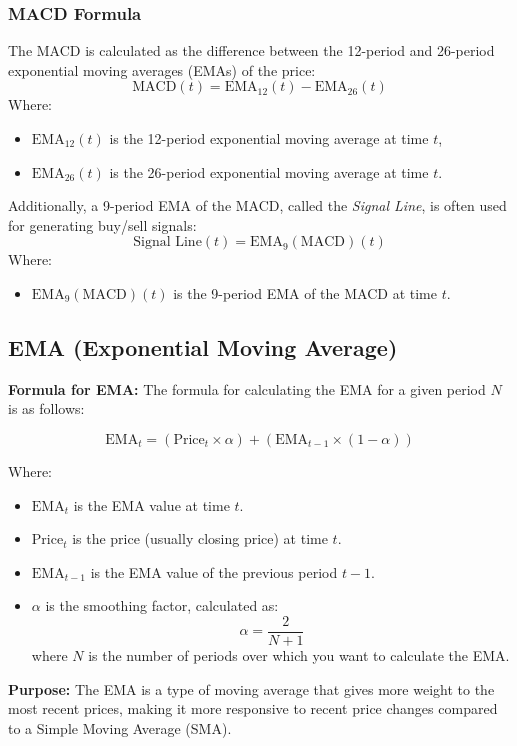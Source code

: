 \documentclass[12pt]{article}
\begin{document}
\subsubsection*{MACD Formula}
The MACD is calculated as the difference between the 12-period and 26-period exponential moving averages (EMAs) of the price:
\[
\text{MACD}(t) = \text{EMA}_{12}(t) - \text{EMA}_{26}(t)
\]
Where:
\begin{itemize}
	\item \(\text{EMA}_{12}(t)\) is the 12-period exponential moving average at time \(t\),
	\item \(\text{EMA}_{26}(t)\) is the 26-period exponential moving average at time \(t\).
\end{itemize}
Additionally, a 9-period EMA of the MACD, called the \textit{Signal Line}, is often used for generating buy/sell signals:
\[
\text{Signal Line}(t) = \text{EMA}_{9}(\text{MACD})(t)
\]
Where:
\begin{itemize}
	\item \(\text{EMA}_{9}(\text{MACD})(t)\) is the 9-period EMA of the MACD at time \(t\).
\end{itemize}

\newpage
\subsection{EMA (Exponential Moving Average)}

\textbf{Formula for EMA:}
The formula for calculating the EMA for a given period $N$ is as follows:

\[
\text{EMA}_t = (\text{Price}_t \times \alpha) + (\text{EMA}_{t-1} \times (1 - \alpha))
\]

Where:
\begin{itemize}
    \item $\text{EMA}_t$ is the EMA value at time $t$.
    \item $\text{Price}_t$ is the price (usually closing price) at time $t$.
    \item $\text{EMA}_{t-1}$ is the EMA value of the previous period $t-1$.
    \item $\alpha$ is the smoothing factor, calculated as:
    \[
    \alpha = \frac{2}{N+1}
    \]
    where $N$ is the number of periods over which you want to calculate the EMA.
\end{itemize}

\textbf{Purpose:}
The EMA is a type of moving average that gives more weight to the most recent prices, making it more responsive to recent price changes compared to a Simple Moving Average (SMA).
\end{document}
